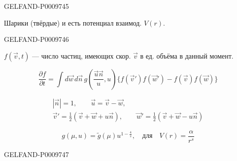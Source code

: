 \begin{GelfandAdjacentEvidence}{GELFAND-P000974}{5}


Шарики (твёрдые) и есть потенциал взаимод. $V(r)$.
\end{GelfandAdjacentEvidence}
\begin{GelfandAdjacentEvidence}{GELFAND-P000974}{6}


$f(\vec v,t)$ --- число частиц, имеющих скор. $\vec v$ в ед. объёма в данный момент.

\begin{equation*}
 \frac{\partial f}{\partial t}
 =\int d\vec w\,d\vec n\,
 g\left(\frac{\vec u\vec n}{u},u\right)
 \{f(\vec v')f(\vec w')-f(\vec v)f(\vec w)\}
 \tag{1}
\end{equation*}

\begin{equation*}
\begin{gathered}
 |\vec n|=1,\qquad \vec u=\vec v-\vec w,\\
 \vec v'=\tfrac12(\vec v+\vec w+u\vec n),\qquad
 \vec w'=\tfrac12(\vec v+\vec w-u\vec n)
\end{gathered}
\tag{2}
\end{equation*}

\begin{equation*}
 g(\mu,u)=\widetilde g(\mu)u^{1-\frac4s},\quad
 \text{для}\quad V(r)=\frac{\alpha}{r^s}
 \tag{3}
\end{equation*}
\end{GelfandAdjacentEvidence}
\begin{GelfandAdjacentEvidence}{GELFAND-P000974}{7}

\end{GelfandAdjacentEvidence}
